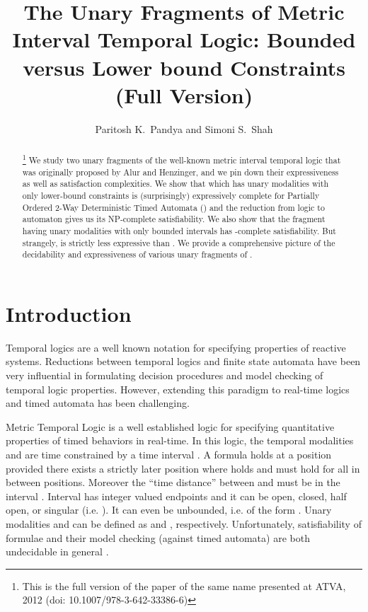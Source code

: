 \documentclass{llncs}
\newcommand{\bmitlfp}{\mbox{}}
\newcommand{\mitlfpinf}{\mbox{}}
\newcommand{\mitlfpb}{\bmitlfp}
\newcommand{\mitl}{\mbox{}}
\newcommand{\nexptime}{\mbox{}}
\begin{document}
\title{The Unary Fragments of Metric Interval Temporal Logic: Bounded versus Lower bound Constraints\\ (Full Version)}
\author{Paritosh K.~Pandya and Simoni S.~Shah}
\pagestyle{empty} 

\maketitle

\begin{abstract}
\footnote{This is the full version of the paper of the same name presented at ATVA, 2012 (doi: 10.1007/978-3-642-33386-6)}
We study two unary fragments of the well-known metric interval temporal logic  that was
originally proposed by Alur and Henzinger, and we pin down their expressiveness
as well as satisfaction complexities. We show that  which has unary
modalities with only lower-bound constraints is (surprisingly) expressively complete for Partially Ordered 2-Way Deterministic Timed Automata () and the reduction from logic to automaton gives us its NP-complete satisfiability. We also show that the fragment  having unary modalities with only bounded intervals has \nexptime-complete satisfiability. But strangely, 
\mitlfpb\/ is strictly less expressive than \mitlfpinf. 
We provide a comprehensive picture of the decidability and expressiveness of various unary fragments of \mitl.
\end{abstract}


\section{Introduction}
Temporal logics are a well known notation for specifying properties of reactive systems.
Reductions between temporal logics and finite state automata have been very influential in formulating decision procedures and model checking of temporal logic properties. 
However, extending this paradigm to real-time logics and timed automata has been challenging.


Metric Temporal Logic  is a well established logic for specifying quantitative properties of  timed behaviors in real-time. 
In this logic, the temporal modalities  and  are time constrained by a time interval . 
A formula  holds at a position  provided
there exists a strictly later position  where  holds and  must hold for all in between positions. Moreover the ``time distance'' between  and  must be in the interval . 
Interval  has integer valued endpoints  and it can be open, closed, half open, or singular (i.e. ). It can even be unbounded, i.e. of the form .  Unary modalities  and  can be defined as  and  , respectively. 
Unfortunately, satisfiability of  formulae and their model checking (against timed automata) are both undecidable in general \cite{AH93,Hen91}.
\end{document}
